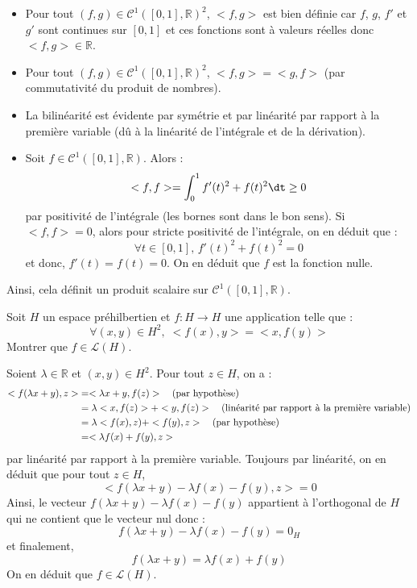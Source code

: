 \documentclass[a4paper,10pt]{report}
\begin{document}
\corr 

\begin{itemize}
\item Pour tout $(f,g) \in \mathcal{C}^1([0,1],\mathbb{R})^2$, $<f,g>$ est bien définie car $f$, $g$, $f'$ et $g'$ sont continues sur $[0,1]$ et ces fonctions sont à valeurs réelles donc $<f,g> \in \mathbb{R}$.
\item Pour tout $(f,g) \in \mathcal{C}^1([0,1],\mathbb{R})^2$, $<f,g>= <g,f>$ (par commutativité du produit de nombres).
\item La bilinéarité est évidente par symétrie et par linéarité par rapport à la première variable (dû à la linéarité de l'intégrale et de la dérivation).
\item Soit $f \in \mathcal{C}^1([0,1],\mathbb{R})$. Alors :
$$ <f,f> =\int_0^1 f'(t)^2+f(t)^2 \dt \geq 0$$
par positivité de l'intégrale (les bornes sont dans le bon sens). Si $<f,f>=0$, alors pour stricte positivité de l'intégrale, on en déduit que :
$$ \forall t \in [0,1], \, f'(t)^2+f(t)^2=0$$
et donc, $f'(t)=f(t)=0$. On en déduit que $f$ est la fonction nulle. 
\end{itemize}
Ainsi, cela définit un produit scalaire sur $\mathcal{C}^1([0,1],\mathbb{R})$.

\begin{Exercice}{} Soit $H$ un espace préhilbertien et $f : H \rightarrow H$ une application telle que :
$$ \forall (x,y) \in H^2, \; <f(x),y>=<x,f(y)>$$
Montrer que $f \in \mathcal{L}(H)$.
\end{Exercice} 

\corr Soient $\lambda \in \mathbb{R}$ et $(x,y) \in H^2$. Pour tout $z \in H$, on a :
\begin{align*}
<f(\lambda x +y),z> & = <\lambda x+y, f(z)> \quad \hbox{(par hypothèse)} \\
& = \lambda <x,f(z)> + <y,f(z)> \quad \hbox{(linéarité par rapport à la première variable)} \\
& = \lambda <f(x),z) + <f(y),z>  \quad \hbox{(par hypothèse)} \\
& = <\lambda f(x)+f(y), z> 
\end{align*}
par linéarité par rapport à la première variable. Toujours par linéarité, on en déduit que pour tout $z \in H$,
$$ <f(\lambda x +y)-\lambda f(x)-f(y), z> =0$$
Ainsi, le vecteur $f(\lambda x +y)-\lambda f(x)-f(y)$ appartient à l'orthogonal de $H$ qui ne contient que le vecteur nul donc :
$$ f(\lambda x +y)-\lambda f(x)-f(y) = 0_H$$
et finalement,
$$ f(\lambda x +y)= \lambda f(x)+f(y)$$
On en déduit que $f \in \mathcal{L}(H)$.
\end{document}
